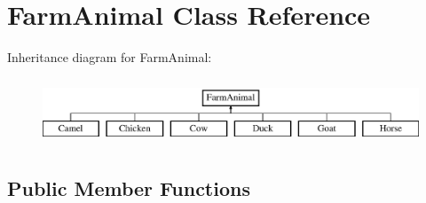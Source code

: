 \hypertarget{class_farm_animal}{}\section{Farm\+Animal Class Reference}
\label{class_farm_animal}
Inheritance diagram for Farm\+Animal\+:\begin{figure}[H]
\begin{center}
\leavevmode
\includegraphics[height=2.000000cm]{class_farm_animal}
\end{center}
\end{figure}
\subsection*{Public Member Functions}
